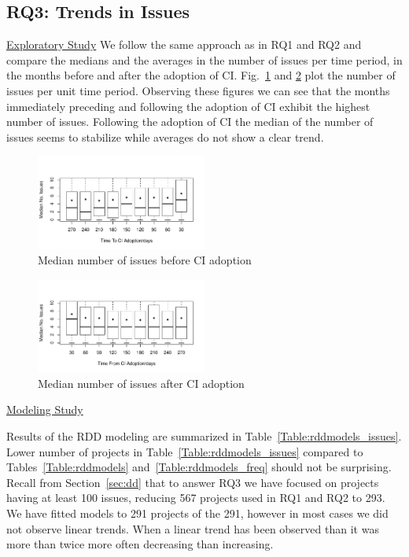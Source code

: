 


\subsection{RQ3: Trends in Issues}

\noindent \underline{Exploratory Study}
We follow the same approach as in RQ1 and RQ2 and compare the medians and the averages in the number of issues per time period, in the months
before and after the adoption of CI.
Fig.~\ref{Fig:IssuesBefore} and \ref{Fig:IssuesAfter} plot the number of issues per unit time period.
Observing these figures we can see that the months immediately 
preceding and following the adoption of CI exhibit the highest number of issues.
Following the adoption of CI the median of the number of issues seems to stabilize while averages do
not show a clear trend. 


\begin{figure}[!t]
\centering
\includegraphics[width=0.5\textwidth]{issues_before.pdf}
\caption{Median number of issues before CI adoption}
\label{Fig:IssuesBefore}
\end{figure}


\begin{figure}[!t]
\centering
\includegraphics[width=0.5\textwidth]{issues_after.pdf}
\caption{Median number of issues after CI adoption}
\label{Fig:IssuesAfter}
\end{figure}

\noindent \underline{Modeling Study}

Results of the RDD modeling are summarized in Table~\ref{Table:rddmodels_issues}.
Lower number of projects in Table~\ref{Table:rddmodels_issues} compared to Tables~\ref{Table:rddmodels} 
and~\ref{Table:rddmodels_freq} should not be surprising. 
Recall from Section~\ref{sec:dd} that to answer RQ3 we have focused on projects having at least 100 issues,
 reducing 567 projects used in RQ1 and RQ2 to 293.
We have fitted models to 291 projects of the 291, however in most cases we did not observe linear trends.
When a linear trend has been observed than it was more than twice more often decreasing than increasing.



